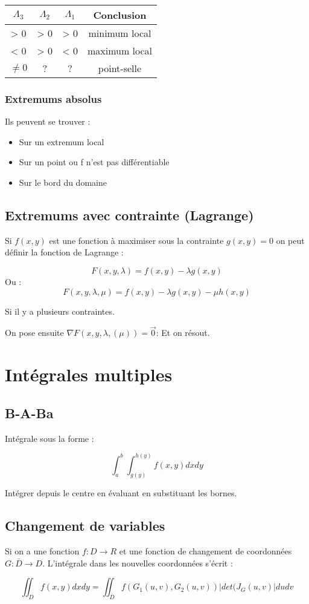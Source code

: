 \documentclass[12pt,a4paper]{report}
\begin{document}
\begin{center}
\begin{tabular}{c|c|c|c}
$\Lambda_3$ & $\Lambda_2$ & $\Lambda_1$ & Conclusion \\ 
\hline
> 0& > 0 & > 0 & minimum local \\ 
< 0 & > 0 & < 0 & maximum local \\ 
$\neq 0$ & ? & ? & point-selle \\ 
\end{tabular} 
\end{center}

\subsection{Extremums absolus}


Ils peuvent se trouver :

\begin{itemize}
\item Sur un extremum local
\item Sur un point ou f n'est pas différentiable
\item Sur le bord du domaine 
\end{itemize}

\section{Extremums avec contrainte (Lagrange)}

Si $f(x,y)$ est une fonction à maximiser sous la contrainte $g(x,y) = 0$ on peut définir la fonction de Lagrange :

$$F(x,y,\lambda) = f(x,y) - \lambda g(x,y)$$
Ou :
$$F(x,y,\lambda, \mu) = f(x,y) - \lambda g(x,y) - \mu h(x,y)$$

Si il y a plusieurs contraintes.

On pose ensuite $\nabla F(x,y,\lambda, (\mu)) = \vec{0}$: Et on résout.

\chapter{Intégrales multiples}

\section{B-A-Ba}

Intégrale sous la forme :

$$\int_a^b \int_{g(y)}^{h(y)} f(x,y) dx dy$$

Intégrer depuis le centre en évaluant en substituant les bornes.

\section{Changement de variables}

Si on a une fonction $f : D \to R$ et une fonction de changement de coordonnées $G : \bar{D} \to D$. L'intégrale dans les nouvelles coordonnées s'écrit :

$$\iint_D f(x,y)dxdy = \iint_{\bar{D}} f(G_1(u,v),G_2(u,v)) |det(J_G(u,v)| dudv$$
\end{document}
